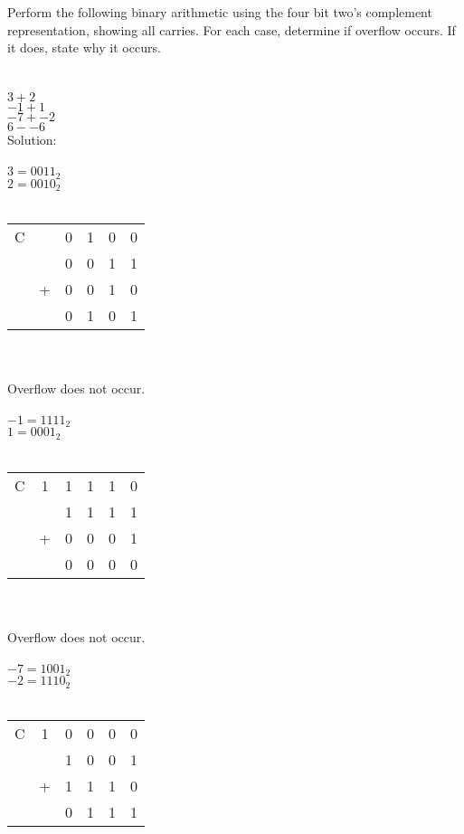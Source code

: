 Perform the following binary arithmetic using the four bit two's complement representation, showing all carries.  For each case, determine if overflow occurs. If it does, state why it occurs.\\
\\
\\
$3 + 2$\\
$-1 + 1$\\
$-7 + -2$\\
$6 - -6$\\

Solution: \\
\\
$3 = 0011_2$\\
$2 = 0010_2$\\
\\
\begin{tabular}{cccccc}
  C &   & 0 & 1 & 0 & 0 \\
    &   & 0 & 0 & 1 & 1 \\
    & + & 0 & 0 & 1 & 0 \\
  \hline
    &   & 0 & 1 & 0 & 1 \\
\end{tabular} \\
\\
Overflow does not occur.\\
\\
$-1 = 1111_2$\\
$1 = 0001_2$\\
\\
\begin{tabular}{cccccc}
  C & 1 & 1 & 1 & 1 & 0 \\
    &   & 1 & 1 & 1 & 1 \\
    & + & 0 & 0 & 0 & 1 \\
  \hline
    &   & 0 & 0 & 0 & 0 \\
\end{tabular} \\
\\
Overflow does not occur.\\
\\
$-7 = 1001_2$\\
$-2 = 1110_2$\\
\\
\begin{tabular}{cccccc}
  C & 1 & 0 & 0 & 0 & 0 \\
    &   & 1 & 0 & 0 & 1 \\
    & + & 1 & 1 & 1 & 0 \\
  \hline
    &   & 0 & 1 & 1 & 1 \\
\end{tabular} \\
